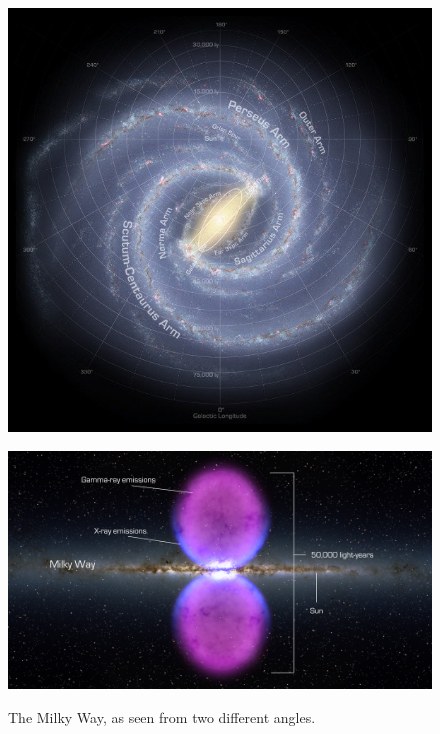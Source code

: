 \begin{figure}[h]
  \centering
  \begin{minipage}[h]{0.45\textwidth}
  	\centering
	\includegraphics[width=1.\linewidth]{pic/theory/top_galaxy_map.jpg}
  	\label{fig:top_gal_map}
  \end{minipage}
  \hfill
  \begin{minipage}[h]{0.45\textwidth}
	  \centering
	  \includegraphics[width=1.\linewidth]{pic/theory/Fermi_bubble.jpg}
	  \label{fig:fermi_bubbles}
  \end{minipage}
  \caption{The Milky Way, as seen from two different angles. }
  \label{fig:Galaxy_maps} 
\end{figure}

